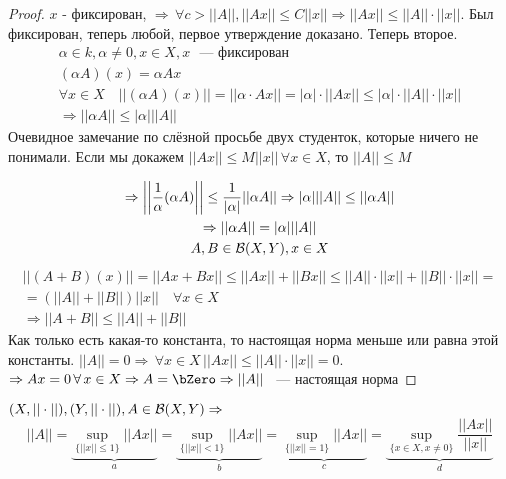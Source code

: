 \documentclass[document]{subfiles}
\begin{document}
\begin{proof}
    $x$ - фиксирован, $\Rightarrow \, \forall c > ||A||, ||Ax|| \leq C ||x|| \Rightarrow ||Ax|| \leq ||A|| \cdot ||x||$. Был фиксирован, теперь любой,
     первое утверждение доказано. Теперь второе. 
     \begin{gather*}
        \alpha \in k, \alpha \ne 0, x \in X, x \text{ ~--- фиксирован } \\
        (\alpha A) (x) = \alpha A x \\
        \forall x \in X \quad ||(\alpha A)(x) || = ||\alpha \cdot Ax|| = |\alpha| \cdot ||A x|| \leq |\alpha| \cdot ||A|| \cdot ||x|| \\
        \Rightarrow ||\alpha A|| \leq |\alpha| ||A||
     \end{gather*}
     Очевидное замечание по слёзной просьбе двух студенток, которые ничего не понимали.
     Если мы докажем $||Ax|| \leq M||x|| \, \forall x \in X$, то $||A|| \leq M$
 
     \begin{gather*}
        \Rightarrow \left|\left| {\frac{1}{\alpha}(\alpha A)} \right| \right| \leq \frac{1}{|\alpha|} ||\alpha A|| \Rightarrow |\alpha| || A|| \leq ||\alpha A|| \\
        \Rightarrow ||\alpha A || = |\alpha| ||A|| \\
        A,B \in \mathcal{B}(X,Y), x \in X 
     \end{gather*}
     \begin{multline*}
        ||(A+B)(x)|| = ||Ax + Bx|| \leq ||Ax|| + ||Bx|| \leq ||A|| \cdot ||x|| + ||B|| \cdot ||x|| = \\
        = (||A|| + ||B||) ||x|| \quad \forall x \in X \\
        \Rightarrow ||A+B|| \leq ||A||+ ||B||
     \end{multline*}
     Как только есть какая-то константа, то настоящая норма меньше или равна этой константы. $||A|| = 0 \Rightarrow \, \forall x \in X \, ||Ax|| \leq ||A|| \cdot ||x|| = 0$.
     $\Rightarrow Ax = 0 \, \forall x \in X \Rightarrow A = \bZero \Rightarrow ||A||$ ~--- настоящая норма
\end{proof}
 
\begin{theorem}
    $(X, ||\cdot||), (Y, ||\cdot||), A \in \mathcal{B}(X,Y) \Rightarrow$ 
    \[ ||A|| = \underbrace{\sup_{\{||x|| \leq 1\}} ||Ax||}_a = \underbrace{\sup_{\{||x|| < 1\}} ||Ax||}_b = \underbrace{\sup_{\{||x|| = 1\}} ||Ax||}_c = \underbrace{\sup_{\{x \in X, x \ne 0\}} \frac{||Ax||}{||x||}}_d \]
\end{theorem}
 
\end{document}
